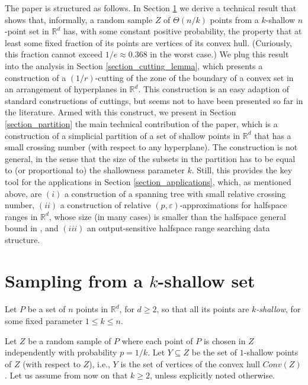\documentclass[11pt]{article}
\def\reals{\mathbb R}
\def\peps{(p,\varepsilon)}
\begin{document}
The paper is structured as follows. In Section \ref{section_sampling} we derive a technical result that shows that, informally, a random sample $Z$ of $\Theta(n/k)$ points from a $k$-shallow $n$-point set in $\reals^{d}$ has, with some constant positive probability, the property that at least some fixed fraction of its points are vertices of its convex hull. (Curiously, this fraction cannot exceed $1/e \approx 0.368$ in the worst case.) We plug this result into the analysis in Section \ref{section_cutting_lemma}, which presents a construction of a $(1/r)$-cutting of the zone of the boundary of a convex set in an arrangement of hyperplanes in $\reals^{d}$. This construction is an easy adaption of standard constructions of cuttings, but seems not to have been presented so far in the literature. Armed with this construct, we present in Section \ref{section_partition} the main technical contribution of the paper, which is a construction of a simplicial partition of a set of shallow points in $\reals^{d}$ that has a small crossing number (with respect to any hyperplane). The construction is not general, in the sense that the size of the subsets in the partition has to be equal to (or proportional to) the shallowness parameter $k$. Still, this provides the key tool for the applications in Section \ref{section_applications}, which, as mentioned above, are $(i)$ a construction of a spanning tree with small relative crossing number, $(ii)$ a construction of relative $\peps$-approximations for halfspace ranges in $\reals^{d}$, whose size (in many cases) is smaller than the halfspace general bound in \cite{lls01,hs11}, and $(iii)$ an output-sensitive halfspace range searching data structure.




\section{Sampling from a $k$-shallow set} \label{section_sampling}

\paragraph{}
Let $P$ be a set of $n$ points in $\reals^{d}$, for $d \geq 2$, so that all its points are $k$\emph{-shallow}, for some fixed parameter $1 \leq k \leq n$.

Let $Z$ be a random sample of $P$ where each point of $P$ is chosen in $Z$ independently with probability $p = 1/k$. Let $Y\subseteq Z$ be the set of $1$-shallow points of $Z$ (with respect to $Z$), i.e., $Y$ is the set of vertices of the convex hull $Conv(Z)$. Let us assume from now on that $k \geq 2$, unless explicitly noted otherwise.
\end{document}
